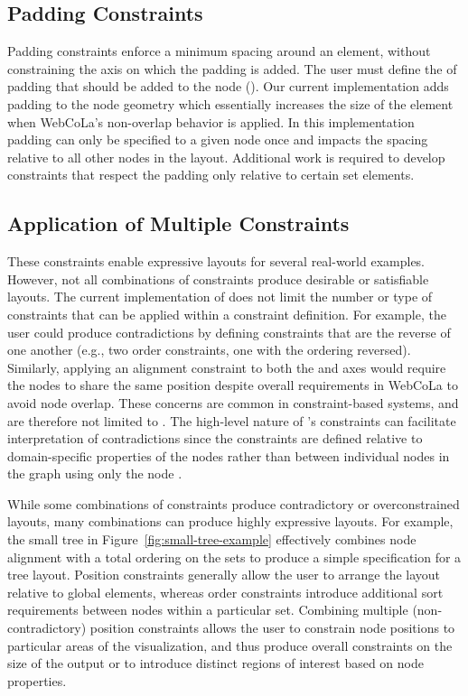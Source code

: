 \subsection{Padding Constraints}
Padding constraints enforce a minimum spacing around an element, without 
constraining the axis on which the padding is added. The user must define 
the  of padding that should be added to the node 
().
Our current implementation adds padding to the node geometry which 
essentially increases the size of the element
when WebCoLa's non-overlap behavior is applied. In this implementation
padding can only be specified to a given node once and impacts the spacing
relative to all other nodes in the layout.
Additional work is required to develop constraints that
respect the padding only relative to certain set elements.

\subsection{Application of Multiple Constraints}
\syphilisLayout
\syphilisSpec
These constraints enable expressive layouts for several real-world examples. However, not 
all combinations of constraints produce desirable or satisfiable layouts.
The current implementation of \projectname does not limit the number or
type of constraints that can be applied within a constraint definition.
For example, the user could produce contradictions by defining constraints
that are the reverse of one another (e.g., two order constraints, one with the
ordering reversed). Similarly, applying an alignment constraint to both the 
and  axes would require the nodes to share the same position despite
overall requirements in WebCoLa to avoid node overlap. These concerns are common in
constraint-based systems, and are therefore not limited to \projectname.
The high-level nature of \projectname's constraints can facilitate
interpretation of contradictions since the constraints are defined
relative to domain-specific properties of the nodes rather than between
individual nodes in the graph using only the node .

While some combinations of constraints produce contradictory or overconstrained layouts,
many combinations can produce highly expressive layouts.
For example, the small tree in Figure~\ref{fig:small-tree-example}
effectively combines node alignment with a total ordering on the sets 
to produce a simple specification for a tree layout. Position constraints
generally allow the user to arrange the layout relative to global elements,
whereas order constraints introduce additional sort requirements between nodes
within a particular set. Combining multiple (non-contradictory) position
constraints allows the user to constrain node positions to particular
areas of the visualization, and thus produce overall constraints on the size of the
output or to introduce distinct regions of interest based on node properties.
